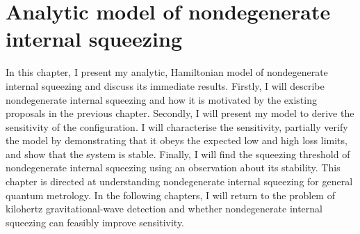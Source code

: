 \chapter{Analytic model of nondegenerate internal squeezing} %
\label{chp:nIS_analytics}





In this chapter, I present my analytic, Hamiltonian model of nondegenerate internal squeezing and discuss its immediate results.
Firstly, I will describe nondegenerate internal squeezing and how it is motivated by the existing proposals in the previous chapter. Secondly, I will present my model to derive the sensitivity of the configuration. I will characterise the sensitivity, partially verify the model by demonstrating that it obeys the expected low and high loss limits, and show that the system is stable. Finally, I will find the squeezing threshold of nondegenerate internal squeezing using an observation about its stability. %
This chapter is directed at understanding nondegenerate internal squeezing for general quantum metrology. In the following chapters, I will return to the problem of kilohertz gravitational-wave detection and whether nondegenerate internal squeezing can feasibly improve sensitivity. 


